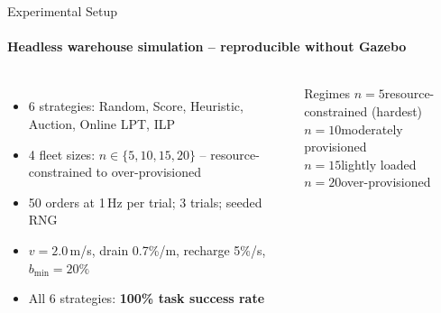 \documentclass[aspectratio=169]{beamer}
\begin{document}
\begin{frame}{Experimental Setup}
  \framesubtitle{Headless warehouse simulation -- reproducible without Gazebo}
  \begin{columns}[onlytextwidth]
      \begin{itemize}
        \item 6 strategies: Random, Score, Heuristic, Auction, Online LPT, \alert{ILP}
        \item 4 fleet sizes: $n \in \{5, 10, 15, 20\}$ -- resource-constrained to over-provisioned
        \item 50 orders at 1\,Hz per trial; 3 trials; seeded RNG
        \item $v=2.0$\,m/s, drain 0.7\%/m, recharge 5\%/s, $b_{\min}=20\%$
        \item All 6 strategies: \textbf{100\% task success rate}
      \end{itemize}
      \begin{block}{Regimes}
        \small
        $n=5$\quad resource-constrained (hardest)\\[3pt]
        $n=10$\quad moderately provisioned\\[3pt]
        $n=15$\quad lightly loaded\\[3pt]
        $n=20$\quad over-provisioned
      \end{block}
  \end{columns}
\end{frame}
\end{document}
